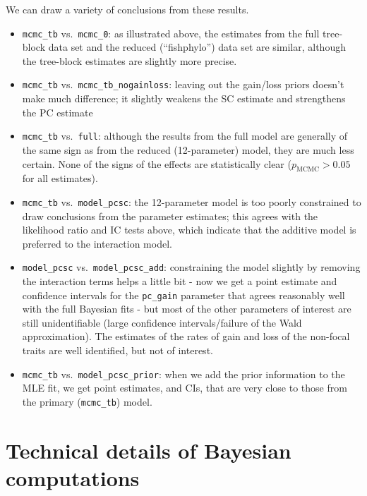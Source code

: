 \documentclass[
]{article}
\providecommand{\tightlist}{%
  \setlength{\itemsep}{0pt}\setlength{\parskip}{0pt}}
\begin{document}
We can draw a variety of conclusions from these results.

\begin{itemize}
\tightlist
\item
  \texttt{mcmc\_tb} vs.~\texttt{mcmc\_0}: as illustrated above, the
  estimates from the full tree-block data set and the reduced
  (``fishphylo'') data set are similar, although the tree-block
  estimates are slightly more precise.
\item
  \texttt{mcmc\_tb} vs.~\texttt{mcmc\_tb\_nogainloss}: leaving out the
  gain/loss priors doesn't make much difference; it slightly weakens the
  SC estimate and strengthens the PC estimate
\item
  \texttt{mcmc\_tb} vs.~\texttt{full}: although the results from the
  full model are generally of the same sign as from the reduced
  (12-parameter) model, they are much less certain. None of the signs of
  the effects are statistically clear (\(p_{\textrm{MCMC}} > 0.05\) for
  all estimates).
\item
  \texttt{mcmc\_tb} vs.~\texttt{model\_pcsc}: the 12-parameter model is
  too poorly constrained to draw conclusions from the parameter
  estimates; this agrees with the likelihood ratio and IC tests above,
  which indicate that the additive model is preferred to the interaction
  model.
\item
  \texttt{model\_pcsc} vs.~\texttt{model\_pcsc\_add}: constraining the
  model slightly by removing the interaction terms helps a little bit -
  now we get a point estimate and confidence intervals for the
  \texttt{pc\_gain} parameter that agrees reasonably well with the full
  Bayesian fits - but most of the other parameters of interest are still
  unidentifiable (large confidence intervals/failure of the Wald
  approximation). The estimates of the rates of gain and loss of the
  non-focal traits are well identified, but not of interest.
\item
  \texttt{mcmc\_tb} vs.~\texttt{model\_pcsc\_prior}: when we add the
  prior information to the MLE fit, we get point estimates, and CIs,
  that are very close to those from the primary (\texttt{mcmc\_tb})
  model.
\end{itemize}

\hypertarget{technical-details-of-bayesian-computations}{%
\section{Technical details of Bayesian
computations}\label{technical-details-of-bayesian-computations}}
\end{document}
